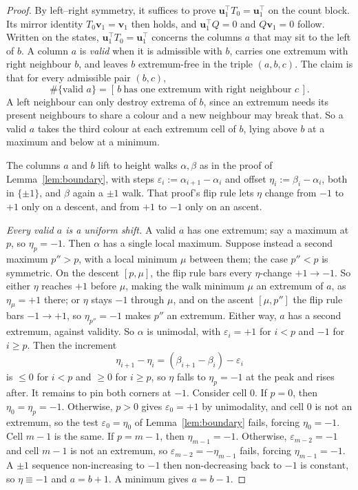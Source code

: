 \documentclass[10pt,a4paper]{amsart}
\begin{document}
\begin{proof}
By left--right symmetry, it suffices to prove $\mathbf u_1^{\!\top}T_0=\mathbf u_1^{\!\top}$ on the
count block. Its mirror identity $T_0\mathbf v_1=\mathbf v_1$
then holds, and $\mathbf u_1^{\!\top}Q=0$ and $Q\mathbf v_1=0$ follow. Written on
the states, $\mathbf u_1^{\!\top}T_0=\mathbf u_1^{\!\top}$ concerns the columns $a$ that may sit to
the left of $b$. A column $a$ is \emph{valid} when it is admissible with $b$, carries one
extremum with right neighbour $b$, and leaves $b$ extremum-free in the triple
$(a,b,c)$. The claim is that for every admissible pair $(b,c)$,
\begin{equation}\label{eq:frozenid}
  \#\{\text{valid }a\}=[\,b\ \text{has one extremum with right neighbour }c\,].
\end{equation}
A left neighbour can only destroy extrema of $b$, since an extremum needs its
present neighbours to share a colour and a new neighbour may break that. So a valid
$a$ takes the third colour at each extremum cell of $b$, lying above $b$ at a
maximum and below at a minimum.

\medskip\noindent
The columns $a$ and $b$ lift to height walks $\alpha,\beta$ as in the proof of
Lemma~\ref{lem:boundary}, with steps $\varepsilon_i:=\alpha_{i+1}-\alpha_i$ and
offset $\eta_i:=\beta_i-\alpha_i$, both in $\{\pm1\}$, and $\beta$ again a $\pm1$
walk. That proof's flip rule lets $\eta$ change from $-1$ to $+1$
only on a descent, and from $+1$ to $-1$ only on an ascent.

\medskip\noindent\emph{Every valid $a$ is a uniform shift.} A valid $a$ has one
extremum; say a maximum at $p$, so $\eta_p=-1$. Then $\alpha$ has a single local
maximum. Suppose instead a second maximum $p''>p$, with a local minimum $\mu$
between them; the case $p''<p$ is symmetric. On the descent $[p,\mu]$, the flip
rule bars every $\eta$-change $+1\to-1$. So either $\eta$ reaches $+1$ before $\mu$,
making the walk minimum $\mu$ an extremum of $a$, as $\eta_\mu=+1$ there; or $\eta$
stays $-1$ through $\mu$, and on the ascent $[\mu,p'']$ the flip rule bars
$-1\to+1$, so $\eta_{p''}=-1$ makes $p''$ an extremum. Either way, $a$ has a second
extremum, against validity. So $\alpha$ is unimodal, with $\varepsilon_i=+1$ for
$i<p$ and $-1$ for $i\ge p$. Then the increment
\[
  \eta_{i+1}-\eta_i=(\beta_{i+1}-\beta_i)-\varepsilon_i
\]
is $\le0$ for $i<p$ and $\ge0$ for $i\ge p$, so $\eta$ falls to $\eta_p=-1$ at the peak and rises after. It
remains to pin both corners at $-1$. Consider cell $0$. If $p=0$, then
$\eta_0=\eta_p=-1$. Otherwise, $p>0$ gives $\varepsilon_0=+1$ by unimodality, and
cell $0$ is not an extremum, so the test $\varepsilon_0=\eta_0$ of
Lemma~\ref{lem:boundary} fails, forcing $\eta_0=-1$. Cell $m-1$ is the same. If
$p=m-1$, then $\eta_{m-1}=-1$. Otherwise, $\varepsilon_{m-2}=-1$ and cell $m-1$ is
not an extremum, so $\varepsilon_{m-2}=-\eta_{m-1}$ fails, forcing $\eta_{m-1}=-1$.
A $\pm1$ sequence non-increasing to $-1$ then non-decreasing back
to $-1$ is constant, so $\eta\equiv-1$ and $a=b+1$. A minimum gives $a=b-1$.


\end{proof}
\end{document}
